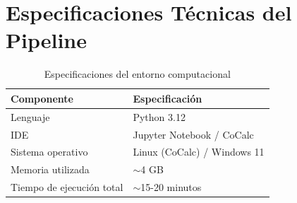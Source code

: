 \documentclass[12pt,a4paper]{article}
\begin{document}
\section{Especificaciones Técnicas del Pipeline}

\begin{table}[H]
\centering
\caption{Especificaciones del entorno computacional}
\label{tab:specs}
\begin{tabular}{@{}ll@{}}
\toprule
\textbf{Componente} & \textbf{Especificación} \\
\midrule
Lenguaje & Python 3.12 \\
IDE & Jupyter Notebook / CoCalc \\
Sistema operativo & Linux (CoCalc) / Windows 11 \\
Memoria utilizada & $\sim$4 GB \\
Tiempo de ejecución total & $\sim$15-20 minutos \\
\bottomrule
\end{tabular}
\end{table}
\end{document}
